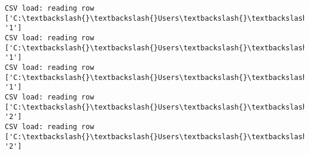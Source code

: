 \documentclass[11pt]{article}
\begin{document}
\begin{Verbatim}[commandchars=\\\{\}]
CSV load: reading row ['C:\textbackslash{}\textbackslash{}Users\textbackslash{}\textbackslash{}AbhishekGangadhar\textbackslash{}\textbackslash{}Downloads\textbackslash{}\textbackslash{}ActionRecog\textbackslash{}\textbackslash{}ActionRecog\textbackslash{}\textbackslash{}DataSets\textbackslash{}\textbackslash{}UCF11\textbackslash{}\textbackslash{}action\_youtube\_naudio\textbackslash{}\textbackslash{}golf\_swing\textbackslash{}\textbackslash{}v\_golf\_15\textbackslash{}\textbackslash{}v\_golf\_15\_02.avi', '1']
CSV load: reading row ['C:\textbackslash{}\textbackslash{}Users\textbackslash{}\textbackslash{}AbhishekGangadhar\textbackslash{}\textbackslash{}Downloads\textbackslash{}\textbackslash{}ActionRecog\textbackslash{}\textbackslash{}ActionRecog\textbackslash{}\textbackslash{}DataSets\textbackslash{}\textbackslash{}UCF11\textbackslash{}\textbackslash{}action\_youtube\_naudio\textbackslash{}\textbackslash{}golf\_swing\textbackslash{}\textbackslash{}v\_golf\_15\textbackslash{}\textbackslash{}v\_golf\_15\_03.avi', '1']
CSV load: reading row ['C:\textbackslash{}\textbackslash{}Users\textbackslash{}\textbackslash{}AbhishekGangadhar\textbackslash{}\textbackslash{}Downloads\textbackslash{}\textbackslash{}ActionRecog\textbackslash{}\textbackslash{}ActionRecog\textbackslash{}\textbackslash{}DataSets\textbackslash{}\textbackslash{}UCF11\textbackslash{}\textbackslash{}action\_youtube\_naudio\textbackslash{}\textbackslash{}golf\_swing\textbackslash{}\textbackslash{}v\_golf\_15\textbackslash{}\textbackslash{}v\_golf\_15\_04.avi', '1']
CSV load: reading row ['C:\textbackslash{}\textbackslash{}Users\textbackslash{}\textbackslash{}AbhishekGangadhar\textbackslash{}\textbackslash{}Downloads\textbackslash{}\textbackslash{}ActionRecog\textbackslash{}\textbackslash{}ActionRecog\textbackslash{}\textbackslash{}DataSets\textbackslash{}\textbackslash{}UCF11\textbackslash{}\textbackslash{}action\_youtube\_naudio\textbackslash{}\textbackslash{}trampoline\_jumping\textbackslash{}\textbackslash{}v\_jumping\_09\textbackslash{}\textbackslash{}v\_jumping\_09\_01.avi', '2']
CSV load: reading row ['C:\textbackslash{}\textbackslash{}Users\textbackslash{}\textbackslash{}AbhishekGangadhar\textbackslash{}\textbackslash{}Downloads\textbackslash{}\textbackslash{}ActionRecog\textbackslash{}\textbackslash{}ActionRecog\textbackslash{}\textbackslash{}DataSets\textbackslash{}\textbackslash{}UCF11\textbackslash{}\textbackslash{}action\_youtube\_naudio\textbackslash{}\textbackslash{}trampoline\_jumping\textbackslash{}\textbackslash{}v\_jumping\_09\textbackslash{}\textbackslash{}v\_jumping\_09\_02.avi', '2']

\end{Verbatim}
\end{document}
